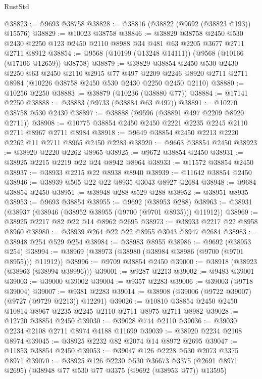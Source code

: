 \begin{lexlean}{RustStd}
\begin{coremodule}
@38823 := @9693 @38758
@38828 := @38816 (@38822 (@9692 (@38823 @193)) @15576)
@38829 := @10023 @38758
@38846 := @38829
    @38758
    @2450
    @530
    @2430
    @2250
    @123
    @2450
    @2110
    @8988
    @34
    @481
    @63
    @2205
    @3677
    @2711
    @2711
    @8912
@38854 := @9568 (@10199 (@13248 @14111)) (@9568 (@10166 (@17106 @12659)) @38758)
@38879 := @38829
    @38854
    @2450
    @530
    @2430
    @2250
    @63
    @2450
    @2110
    @2915
    @77
    @497
    @2209
    @2246
    @8920
    @2711
    @2711
    @8984
    (@10226 @38758 @2450 @530 @2430 @2250 @2450 @2110)
@38880 := @10256 @2250
@38883 := @38879 (@10236 (@38880 @77))
@38884 := @17141 @2250
@38888 := @38883 (@9733 (@38884 @63 @497))
@38891 := @10270 @38758 @530 @2430
@38897 := @38888 (@9596 (@38891 @497 @2209 @8920 @2711))
@38908 := @10775 @38854 @2450 @2450 @2221 @2235 @2245 @2110 @2711 @8967 @2711 @8984
@38918 := @9649 @38854 @2450 @2213 @2220 @2262 @11 @2711 @8965 @2450 @2283
@38920 := @9663 @38854 @2450
@38923 := @38920 @2220 @2262 @8965
@38925 := @9672 @38854 @2450
@38931 := @38925 @2215 @2219 @22 @24 @8942 @8964
@38933 := @11572 @38854 @2450
@38937 := @38933 @2215 @22 @8938 @8940
@38939 := @11642 @38854 @2450
@38946 := @38939 @505 @22 @22 @8935 @3043 @8927 @2684
@38948 := @9684 @38854 @2450
@38951 := @38948 @288 @529 @288
@38952 := @38951 @8935
@38953 := @9693 @38854
@38955 := @9692 (@38953 @288)
@38963 := @38931 (@38937 (@38946 (@38952 @38955 (@9700 (@9701 @8935))) @11912))
@38969 := @38925 @2217 @82 @22 @14 @8962 @2695
@38973 := @38933 @2217 @22 @8958 @8960
@38980 := @38939 @264 @22 @22 @8955 @3043 @8947 @2684
@38983 := @38948 @254 @529 @254
@38984 := @38983 @8955
@38986 := @9692 (@38953 @254)
@38994 := @38969 (@38973 (@38980 (@38984 @38986 (@9700 (@9701 @8955))) @11912))
@38996 := @9709 @38854 @2450
@39000 := @38918 (@38923 (@38963 (@38994 @38996)))
@39001 := @9287 @2213
@39002 := @9483 @39001
@39003 := @39000 @39002
@39004 := @9357 @2283
@39006 := @39003 (@9718 @39004)
@39007 := @9381 @2283
@39014 := @38908 (@39006 (@9722 @39007) (@9727 (@9729 @2213)) @12291)
@39026 := @10810 @38854 @2450 @2450 @10814 @8967 @2235 @2245 @2110 @2711 @8975 @2711 @8982
@39028 := @12720 @38854 @2450
@39030 := @39028 @744 @2110
@39036 := @39030 @2234 @2108 @2711 @8974 @4188 @11699
@39039 := @38920 @2234 @2108 @8974
@39045 := @38925 @2232 @82 @2074 @14 @8972 @2695
@39047 := @11853 @38854 @2450
@39053 := @39047 @126 @2228 @530 @2073 @3375 @8971
@39070 := @38925
    @126
    @2230
    @530
    @36673
    @3375
    (@2691 @8971 @2695)
    (@38948 @77 @530 @77 @3375 (@9692 (@38953 @77)) @13595)

\end{coremodule}
\end{lexlean}
